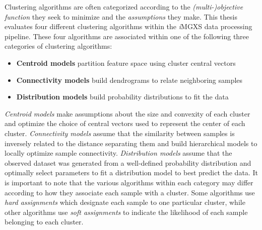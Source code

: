 Clustering algorithms are often categorized according to the \textit{(multi-)objective function} they seek to minimize and the \textit{assumptions} they make. This thesis evaluates four different clustering algorithms within the \textit{i}\ac{MGXS} data processing pipeline. These four algorithms are associated within one of the following three categories of clustering algorithms:
 
\begin{itemize}[noitemsep]
\item \textbf{Centroid models} partition feature space using cluster central vectors
\item \textbf{Connectivity models} build dendrograms to relate neighboring samples
\item \textbf{Distribution models} build probability distributions to fit the data
\end{itemize}

\noindent \textit{Centroid models} make assumptions about the size and convexity of each cluster and optimize the choice of central vectors used to represent the center of each cluster. \textit{Connectivity models} assume that the similarity between samples is inversely related to the distance separating them and build hierarchical models to locally optimize sample connectivity. \textit{Distribution models} assume that the observed dataset was generated from a well-defined probability distribution and optimally select parameters to fit a distribution model to best predict the data. It is important to note that the various algorithms within each category may differ according to how they associate each sample with a cluster. Some algorithms use \textit{hard assignments} which designate each sample to one particular cluster, while other algorithms use \textit{soft assignments} to indicate the likelihood of each sample belonging to each cluster.

